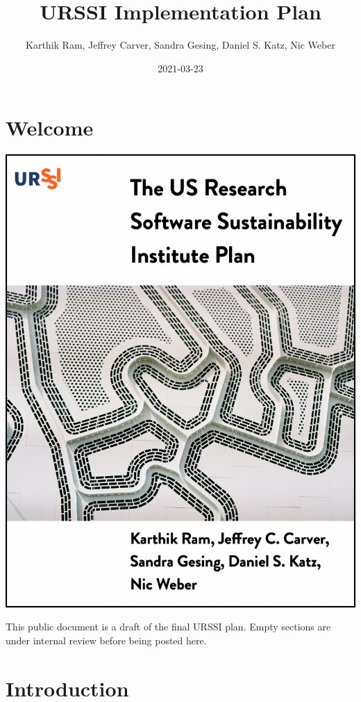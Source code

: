 \documentclass[
]{book}
\title{URSSI Implementation Plan}
\author{Karthik Ram, Jeffrey Carver, Sandra Gesing, Daniel S. Katz, Nic Weber}
\date{2021-03-23}
\begin{document}
\maketitle

{
\setcounter{tocdepth}{1}
\tableofcontents
}
\hypertarget{welcome}{%
\chapter*{Welcome}\label{welcome}}

\includegraphics[width=17.85in]{images/plan_png}

This public document is a draft of the final URSSI plan. Empty sections are under internal review before being posted here.

\hypertarget{intro}{%
\chapter{Introduction}\label{intro}}
\end{document}

